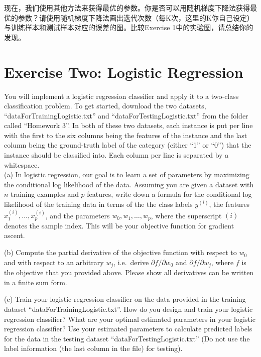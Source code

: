 \documentclass[a4paper]{article}
\theoremstyle{definition}
\begin{document}
现在，我们使用其他方法来获得最优的参数。你是否可以用随机梯度下降法获得最优的参数？请使用随机梯度下降法画出迭代次数（每K次，这里的K你自己设定）与训练样本和测试样本对应的误差的图。比较Exercise 1中的实验图，请总结你的发现。

\section{Exercise Two: Logistic Regression}
You will implement a logistic regression classifier and apply it to a two-class classification problem. 
To get started, download the two datasets, ``dataForTrainingLogistic.txt'' and ``dataForTestingLogistic.txt'' from the folder called ``Homework 3''. In both of these two datasets, each instance is put per line with the first to the six columns being the features of the instance and the last column being the ground-truth label of the category (either ``1'' or ``0'') that the instance should be classified into. Each column per line is separated by a whitespace.\\


(a) In logistic regression, our goal is to learn a set of parameters by maximizing the conditional log likelihood of the data. Assuming you are given a dataset with $n$ training examples and $p$ features, write down a formula for the conditional log likelihood of the training data in terms of the the class labels $y^{(i)}$, the features $x^{(i)}_1, \ldots, x^{(i)}_p$, and the parameters $w_0, w_1, \ldots, w_p$, where the superscript $(i)$ denotes the sample index. This will be your objective function for gradient ascent. \newline

(b) Compute the partial derivative of the objective function with respect to $w_0$ and with respect to an arbitrary $w_j$, i.e.~derive $\partial f / \partial w_0$ and $\partial f / \partial w_j$, where $f$ is the objective that you provided above.
Please show all derivatives can be written in a finite sum form.\newline

(c) Train your logistic regression classifier on the data provided in the training dataset ``dataForTrainingLogistic.txt''. How do you design and train your logistic regression classifier? What are your optimal estimated parameters in your logistic regression classifier? Use your estimated parameters  to calculate predicted labels for the data in the testing dataset ``dataForTestingLogistic.txt'' (Do not use the label information (the last column in the file) for testing).\\
\end{document}
